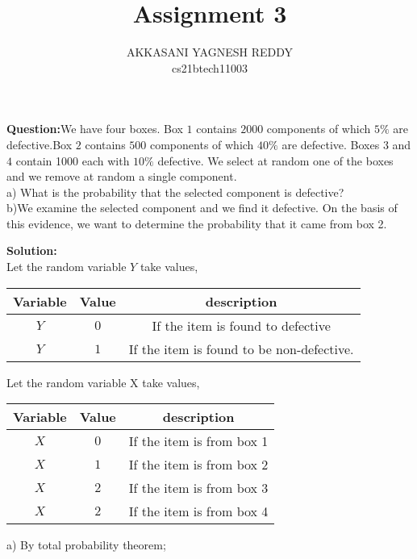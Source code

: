 \documentclass[journal,12pt,twocolumn]{IEEEtran}
\title{Assignment 3}
\author{AKKASANI YAGNESH REDDY \\
     cs21btech11003 \\}
\begin{document}
     \maketitle
     \textbf{Question:}We have four boxes. Box $1$ contains $2000$ components of which $5\%$ are defective.Box $2$ contains $500$ components of which $40\%$ are defective. Boxes $3$ and $4$ contain 1000 each with $10\%$ defective. We select at random one of the boxes and we remove at random a single component.\\
     a) What is the probability that the selected component is defective?\\
     b)We examine the selected component and we find it defective. On the basis of this evidence, we want to determine the probability that it came from box 2.
     
     
     \textbf{Solution:}\\
Let the random variable $Y$ take values,\\
     \begin{table}[h!]
    \centering
    \begin{tabular}{|c|c|c|} \hline
    \textbf{Variable} & \textbf{Value} & \textbf{description} \\ \hline
         $Y$ & $0$ & If the item is found to defective \\ \hline
         $Y$ & $1$ & If the item is found to be non-defective.\\ \hline
     \end{tabular}
     \end{table}
     
Let the random variable X take values,\\
 \begin{table}[h!]
    \centering
    \begin{tabular}{|c|c|c|} \hline
    \textbf{Variable} & \textbf{Value} & \textbf{description} \\ \hline
    $X$ & $0$ & If the item is from box 1 \\ \hline
        $X$ & $1$ & If the item is from box 2 \\ \hline
        $X$ & $2$ & If the item is from box 3 \\ \hline
        $X$ & $2$ & If the item is from box 4 \\ \hline
    
    \end{tabular}
    \end{table}
    
    a) By total probability theorem;
    
\end{document}
